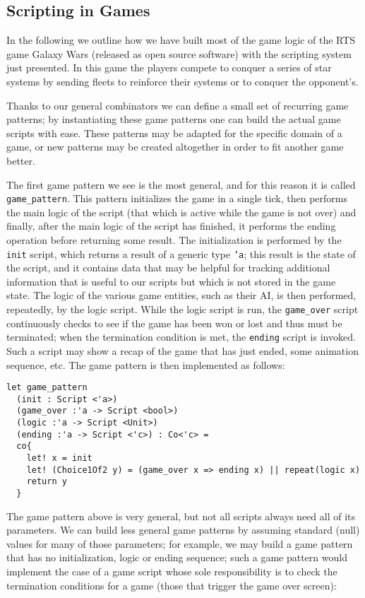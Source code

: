 \subsection{Scripting in Games}
In the following we outline how we have built most of the game logic of the RTS game Galaxy Wars (released as open source software) with the scripting system just presented. In this game the players compete to conquer a series of star systems by sending fleets to reinforce their systems or to conquer the opponent's.

Thanks to our general combinators we can define a small set of recurring game patterns; by instantiating these game patterns one can build the actual game scripts with ease. These patterns may be adapted for the specific domain of a game, or new patterns may be created altogether in order to fit another game better. 

The first game pattern we see is the most general, and for this reason it is called \texttt{game\_pattern}. This pattern initializes the game in a single tick, then performs the main logic of the script (that which is active while the game is not over) and finally, after the main logic of the script has finished, it performs the ending operation before returning some result. The initialization is performed by the \texttt{init} script, which returns a result of a generic type \texttt{'a}; this result is the state of the script, and it contains data that may be helpful for tracking additional information that is useful to our scripts but which is not stored in the game state. The logic of the various game entities, such as their AI, is then performed, repeatedly, by the logic script. While the logic script is run, the \texttt{game\_over} script continuously checks to see if the game has been won or lost and thus must be terminated; when the termination condition is met, the
\texttt{ending} script is invoked. Such a script may show a recap of the game that has just ended, some animation sequence, etc. The game pattern is then implemented as follows:

\begin{lstlisting}
let game_pattern
  (init : Script <'a>)
  (game_over :'a -> Script <bool>)
  (logic :'a -> Script <Unit>)
  (ending :'a -> Script <'c>) : Co<'c> =
  co{
    let! x = init
    let! (Choice1Of2 y) = (game_over x => ending x) || repeat(logic x)
    return y
  }
\end{lstlisting}

The game pattern above is very general, but not all scripts always need all of its parameters. We can build less general game patterns by assuming standard (null) values for many of those parameters; for example, we may build a game pattern that has no initialization, logic or ending sequence; such a game pattern would implement the case of a game script whose sole responsibility is to check the termination conditions for a game (those that trigger the game over screen):

